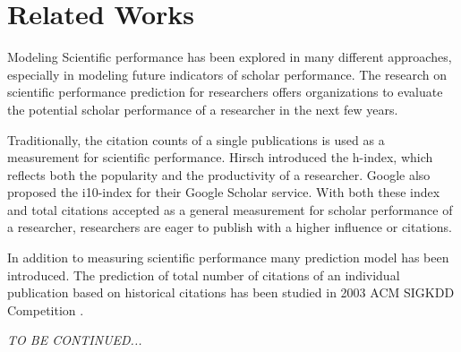 \section{Related Works}
Modeling Scientific performance has been explored in many different approaches, especially in modeling future indicators of scholar performance.
The research on scientific performance prediction for researchers offers organizations to evaluate the potential scholar performance of a researcher in the next few years.

Traditionally, the citation counts of a single publications is used as a measurement for scientific performance.
Hirsch introduced the h-index, which reflects both the popularity and the productivity of a researcher\cite{hirsch2005index}.
Google also proposed the i10-index for their Google Scholar service.
With both these index and total citations accepted as a general measurement for scholar performance of a researcher, researchers are eager to publish with a higher influence or citations.

In addition to measuring scientific performance many prediction model has been introduced.
The prediction of total number of citations of an individual publication based on historical citations has been studied in 2003 ACM SIGKDD Competition \cite{gehrke2003overview}.

{\it TO BE CONTINUED...}